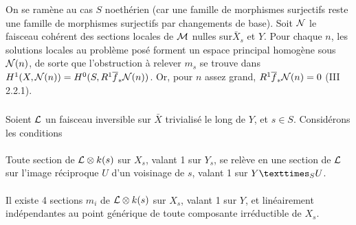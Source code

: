 \documentclass[10pt]{../fichiers-configuration-latex/smfart}
\begin{document}
On se ramène au cas $S$ noethérien (car une famille de morphismes
surjectifs reste une famille de morphismes surjectifs par changements de
base).
Soit ${\mathcal N}$ le faisceau cohérent des sections locales
de ${\mathcal M}$ nulles sur\pageoriginale $\bar{X}_{s}$ et $Y$. Pour
chaque $n$, les solutions locales au problème posé forment un espace
principal homogène sous ${\mathcal N}(n)$, de sorte que l'obstruction à
relever $m_{s}$ se trouve dans
$H^{1}(X,{\mathcal N}(n))=H^{0}(S,R^{1}\overline{f}_{\ast}{\mathcal N}(n))$. Or,
pour $n$ assez grand, $R^{1}\overline{f}_{\ast}{\mathcal N}(n)=0$ (\EGA III 2.2.1).

\setcounter{subsubsection}{9}
\subsubsection{}
Soient ${\mathcal L}$ un faisceau inversible sur $\bar{X}$ trivialisé
le long de $Y$, et $s\in S$. Considérons les conditions

\paragraph{}
Toute section de ${\mathcal L}\otimes k(s)$ sur $X_{s}$, valant 1 sur
$Y_{s}$, se relève en une section de ${\mathcal L}$ sur l'image
réciproque $U$ d'un voisinage de $s$, valant 1 sur $\fprod{Y}{U}{S}$.

\paragraph{}
Il existe 4 sections $m_{i}$ de ${\mathcal L}\otimes k(s)$ sur $X_{s}$,
valant 1 sur $Y$, et linéairement indépendantes au point générique de
toute composante irréductible de $X_{s}$.
\end{document}
